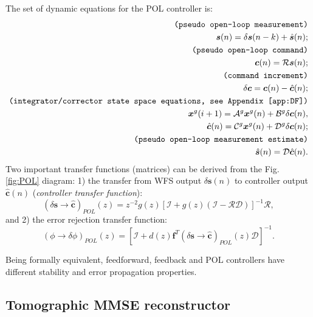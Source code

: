 The set of dynamic equations for the POL controller is:
\begin{align}
  \texttt{(pseudo open-loop measurement)} \nonumber \\
	\bm{s}(n) = \delta \bm{s}(n-k) + \hat{\bm{s}}(n); \label{eq:POL-meas} \\
	\texttt{(pseudo open-loop command)} \nonumber \\
  \bm{c}(n) = \mathcal{R} \bm{s}(n); \label{eq:POL-est} \\
  \texttt{(command increment)} \nonumber \\
  \delta \bm{c} = \bm{c}(n) - \hat{\bm{c}}(n); \\
  \texttt{(integrator/corrector state space equations, see Appendix
  \ref{app:DF})} \nonumber \\
  \bm{x}^{g}(i+1) = \mathcal{A}^{g} \bm{x}^{g}(n) +
                    \mathcal{B}^{g} \delta \bm{c}(n), \\
  \hat{\bm{c}}(n) = \mathcal{C}^{g} \bm{x}^{g}(n) +
                    \mathcal{D}^{g} \delta \bm{c}(n); \\
  \texttt{(pseudo open-loop measurement estimate)} \nonumber \\
  \hat{\bm{s}}(n) = \mathcal{D} \hat{\bm{c}}(n).
\end{align}
Two important transfer functions (matrices) can be derived from the Fig.
\ref{fig:POL} diagram: 1) the transfer from WFS output $\delta \bm{s}(n)$ to
controller output $\hat{\bm{c}}(n)$ (\emph{controller transfer function}):
\begin{equation} \label{eq:WFS-to-Control}
	(\delta \bm{s} \rightarrow \hat{\bm{c}})_{POL}(z) =
	z^{-2} g(z) \left[ \mathcal{I} +
	g(z) (\mathcal{I}-\mathcal{RD}) \right]^{-1} \mathcal{R},
\end{equation}
and 2) the error rejection transfer function:
\begin{equation} \label{eq:phase-to-error}
	(\phi \rightarrow \delta \phi)_{POL}(z) =
	\left[ \mathcal{I} + d(z) \bm{f}^{T}
	(\delta \bm{s} \rightarrow \hat{\bm{c}})_{POL}(z) \mathcal{D} \right]^{-1}.
\end{equation}

Being formally equivalent, feedforward, feedback and POL controllers have
different stability and error propagation properties.

\subsection{Tomographic MMSE reconstructor}
\label{subsec:MMSE-tomo}

